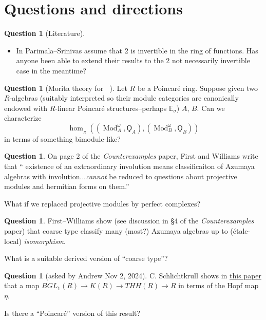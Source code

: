 \documentclass{article}
\DeclareMathOperator{\Catp}{Cat^p_\infty} %
\DeclareMathOperator{\Mod}{Mod} %
\theoremstyle{definition}
\newtheorem{question}[equation]{Question}
\begin{document}
\section{Questions and directions}
\begin{question}
    [Literature]
\begin{itemize}
    \item In \cite{MR1162189} Parimala--Srinivas assume that 2 is invertible in the ring of functions. 
    Has anyone been able to extend their results to the 2 not necessarily invertible case in the meantime? 
\end{itemize}
\end{question}
\begin{question}
    [Morita theory for $ \Catp $]
    Let $ R $ be a Poincaré ring. 
    Suppose given two $ R $-algebras (suitably interpreted so their module categories are canonically endowed with $ R $-linear Poincaré structures--perhaps $ \mathbb{E}_\sigma $) $ A $, $ B $. 
    Can we characterize
    \begin{equation*}
        \hom_{\Catp_R}\left(\left(\Mod_A^\omega,\Qoppa_A\right),\left(\Mod_B^\omega,\Qoppa_B\right)\right)
     \end{equation*} 
     in terms of something bimodule-like? 
\end{question}
\begin{question}
    On page 2 of the \emph{Counterexamples} paper, First and Williams write that `` existence of an extraordinary involution means classificaiton of Azumaya algebras with involution...\emph{cannot} be reduced to questions about projective modules and hermitian forms on them.'' 

    What if we replaced projective modules by perfect complexes? 
\end{question}
\begin{question}
    First--Williams show (see discussion in \S4 of the \emph{Counterexamples} paper) that coarse type classify many (most?) Azumaya algebras up to (étale-local) \emph{isomorphism}. 

    What is a suitable derived version of ``coarse type''?
\end{question}

\begin{question}
    [asked by Andrew Nov 2, 2024] 
    C. Schlichtkrull shows in \href{https://arxiv.org/pdf/math/0405079}{this paper} that a map $ BGL_1(R) \to K(R) \to THH(R) \to R $ in terms of the Hopf map $ \eta $. 

    Is there a ``Poincaré'' version of this result? 
\end{question}
\end{document}
